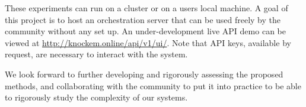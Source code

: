 These experiments can run on a cluster or on a users local machine.
A goal of this project is to host an orchestration server that can be used freely by the community without any set up.
An under-development live API demo can be viewed at \url{http://knockem.online/api/v1/ui/}.
Note that API keys, available by request, are necessary to interact with the system.

We look forward to further developing and rigorously assessing the proposed methods, and collaborating with the community to put it into practice to be able to rigorously study the complexity of our systems.
